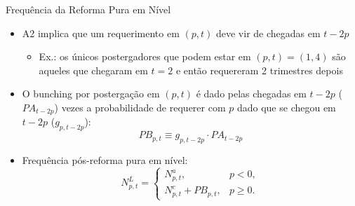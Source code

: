 \begin{frame}{Frequência da Reforma Pura em Nível}
    \begin{itemize}
        \item A2 implica que um requerimento em $(p,t)$ deve vir de chegadas em $t-2p$
        \begin{itemize}
            \item Ex.: os únicos postergadores que podem estar em $(p,t)=(1,4)$ são aqueles que chegaram em $t=2$ e então requereram 2 trimestres depois
        \end{itemize}
        \item O bunching por postergação em $(p,t)$ é dado pelas chegadas em $t-2p$ ($PA_{t-2p}$) vezes a probabilidade de requerer com $p$ dado que se chegou em $t-2p$ ($g_{p,t-2p}$):
    \[
        PB_{p,t}\equiv g_{p,t-2p}\cdot PA_{t-2p}
    \]
    \item Frequência pós-reforma pura em nível:
    \[
        N^{L}_{p,t}=
        \begin{cases}
            N^{a}_{p,t}, & p<0,\\[3pt]
            N^{c}_{p,t}+PB_{p,t}, & p\ge 0.
        \end{cases}
    \]
\end{itemize}
\end{frame}

